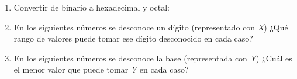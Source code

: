 \documentclass[12pt]{article}
\begin{document}
\begin{enumerate}[resume]
\begin{enumerate*}[itemjoin=\hspace{2em}]
    \end{enumerate*}

    \item Convertir de binario a hexadecimal y octal:


    \item En los siguientes números se desconoce un dígito (representado con
        \emph{X}) ¿Qué rango de valores puede tomar ese dígito desconocido en cada caso?


    \item En los siguientes números se desconoce la base (representada con
        \emph{Y}) ¿Cuál es el menor valor que puede tomar \emph{Y} en cada
        caso?


\end{enumerate}
\end{document}
